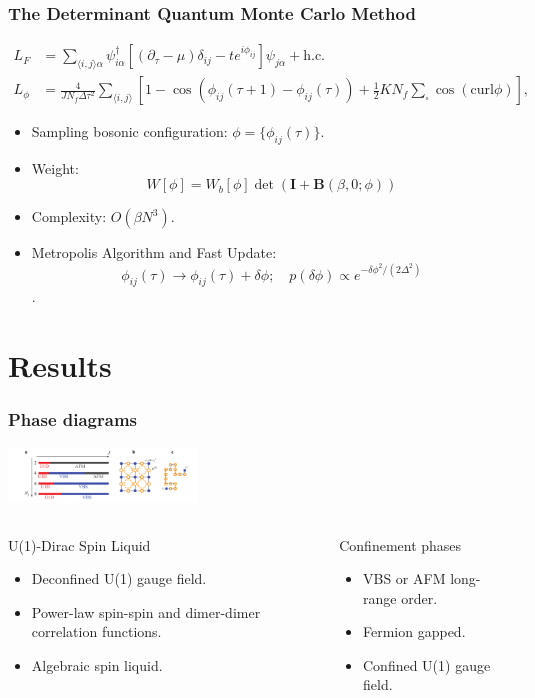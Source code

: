 \documentclass[xcolor=table, 10pt, aspectratio=169]{beamer}
\begin{document}
\begin{frame}
  \frametitle{The Determinant Quantum Monte Carlo Method}
  \begin{align*}
  L_F &= \sum_{\langle i,j \rangle\alpha}{\psi}^{\dagger}_{i\alpha} \left[(\partial_\tau -\mu)\delta_{ij}-t e^{i\phi_{ij}}   \right]   {\psi}_{j\alpha} + \text{h.c.}\\
  L_\phi &= \frac{4} {JN_{f}\Delta \tau ^2} \sum_{\langle i,j \rangle}
  \left[ 1-\cos(\phi_{ij}(\tau+1)-\phi_{ij}(\tau))
   +\frac{1}{2}K N_f\sum_{\square}\cos (\text{curl} \phi) \right],
\end{align*}
\begin{itemize}
  \item Sampling bosonic configuration: $\phi = \{\phi_{ij}(\tau)\}$.
  \item Weight:
  \[W[\phi] = W_b[\phi]\det(\mathbf I + \mathbf B(\beta,0;\phi))\]
  \item Complexity: $O(\beta N^3)$.
  \item Metropolis Algorithm and Fast Update:
  \[\phi_{ij}(\tau)\rightarrow\phi_{ij}(\tau)+\delta\phi;\quad p(\delta\phi)\propto e^{-\delta\phi^2/(2\Delta^2)}\].
\end{itemize}
\end{frame}

\section{Results}

\begin{frame}
  \frametitle{Phase diagrams}
  \begin{center}
    \includegraphics[width=5cm]{phase-diagram}
  \end{center}
  \begin{columns}[t]
    \begin{block}{U(1)-Dirac Spin Liquid}
      \begin{itemize}
        \item Deconfined U(1) gauge field.
        \item Power-law spin-spin and dimer-dimer correlation functions.
        \item Algebraic spin liquid.
      \end{itemize}
    \end{block}

    \begin{block}{Confinement phases}
      \begin{itemize}
        \item VBS or AFM long-range order.
        \item Fermion gapped.
        \item Confined U(1) gauge field.
      \end{itemize}
    \end{block}
  \end{columns}
\end{frame}
\end{document}
